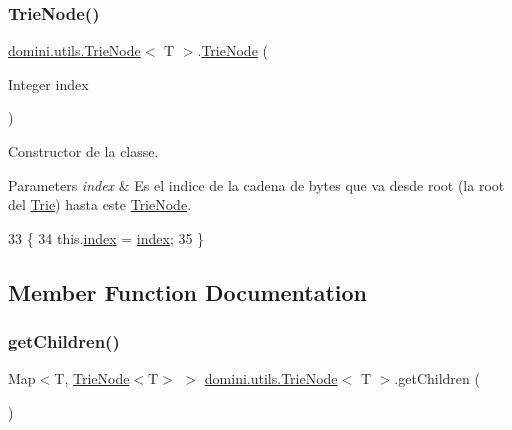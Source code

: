 \subsubsection{\texorpdfstring{Trie\+Node()}{TrieNode()}}
{\footnotesize\ttfamily \hyperlink{classdomini_1_1utils_1_1TrieNode}{domini.\+utils.\+Trie\+Node}$<$ T $>$.\hyperlink{classdomini_1_1utils_1_1TrieNode}{Trie\+Node} (\begin{DoxyParamCaption}\item[{Integer}]{index }\end{DoxyParamCaption})\hspace{0.3cm}{\ttfamily [inline]}}



Constructor de la classe. 


\begin{DoxyParams}{Parameters}
{\em index} & Es el indice de la cadena de bytes que va desde root (la root del \hyperlink{classdomini_1_1utils_1_1Trie}{Trie}) hasta este \hyperlink{classdomini_1_1utils_1_1TrieNode}{Trie\+Node}. \\
\hline
\end{DoxyParams}

\begin{DoxyCode}
33                                   \{
34         this.\hyperlink{classdomini_1_1utils_1_1TrieNode_a9c247bc6568131e5e6ad0758adb67bfa}{index} = \hyperlink{classdomini_1_1utils_1_1TrieNode_a9c247bc6568131e5e6ad0758adb67bfa}{index};
35     \}
\end{DoxyCode}


\subsection{Member Function Documentation}
\mbox{\label{classdomini_1_1utils_1_1TrieNode_ace4e12a6dd51d77d6d24447eca520478}} 
\subsubsection{\texorpdfstring{get\+Children()}{getChildren()}}
{\footnotesize\ttfamily Map$<$T, \hyperlink{classdomini_1_1utils_1_1TrieNode}{Trie\+Node}$<$T$>$ $>$ \hyperlink{classdomini_1_1utils_1_1TrieNode}{domini.\+utils.\+Trie\+Node}$<$ T $>$.get\+Children (\begin{DoxyParamCaption}{ }\end{DoxyParamCaption})\hspace{0.3cm}{\ttfamily [inline]}}


